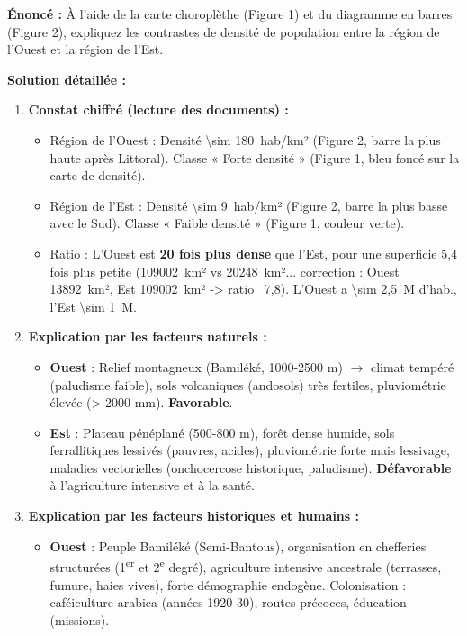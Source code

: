 \documentclass[11pt]{article}
\begin{document}
\begin{exoresolu}
\textbf{Énoncé :} À l'aide de la carte choroplèthe (Figure 1) et du diagramme en barres (Figure 2), expliquez les contrastes de densité de population entre la région de l'Ouest et la région de l'Est.

\textbf{Solution détaillée :}
\begin{enumerate}
\item \textbf{Constat chiffré (lecture des documents) :}
      \begin{itemize}
      \item Région de l'Ouest : Densité \SI{\sim 180}{hab/km²} (Figure 2, barre la plus haute après Littoral). Classe « Forte densité » (Figure 1, bleu foncé sur la carte de densité).
      \item Région de l'Est : Densité \SI{\sim 9}{hab/km²} (Figure 2, barre la plus basse avec le Sud). Classe « Faible densité » (Figure 1, couleur verte).
      \item Ratio : L'Ouest est \textbf{20 fois plus dense} que l'Est, pour une superficie 5,4 fois plus petite (\SI{109 002}{km²} vs \SI{20 248}{km²}... correction : Ouest \SI{13 892}{km²}, Est \SI{109 002}{km²} -> ratio ~7,8). L'Ouest a \SI{\sim 2,5}{M} d'hab., l'Est \SI{\sim 1}{M}.
      \end{itemize}
\item \textbf{Explication par les facteurs naturels :}
      \begin{itemize}
      \item \textbf{Ouest} : Relief montagneux (Bamiléké, 1000-2500 m) $\rightarrow$ climat tempéré (paludisme faible), sols volcaniques (andosols) très fertiles, pluviométrie élevée (> 2000 mm). \textbf{Favorable}.
      \item \textbf{Est} : Plateau pénéplané (500-800 m), forêt dense humide, sols ferrallitiques lessivés (pauvres, acides), pluviométrie forte mais lessivage, maladies vectorielles (onchocercose historique, paludisme). \textbf{Défavorable} à l'agriculture intensive et à la santé.
      \end{itemize}
\item \textbf{Explication par les facteurs historiques et humains :}
      \begin{itemize}
      \item \textbf{Ouest} : Peuple Bamiléké (Semi-Bantous), organisation en chefferies structurées (1\textsuperscript{er} et 2\textsuperscript{e} degré), agriculture intensive ancestrale (terrasses, fumure, haies vives), forte démographie endogène. Colonisation : caféiculture arabica (années 1920-30), routes précoces, éducation (missions).

\end{itemize}
\end{enumerate}
\end{exoresolu}
\end{document}
